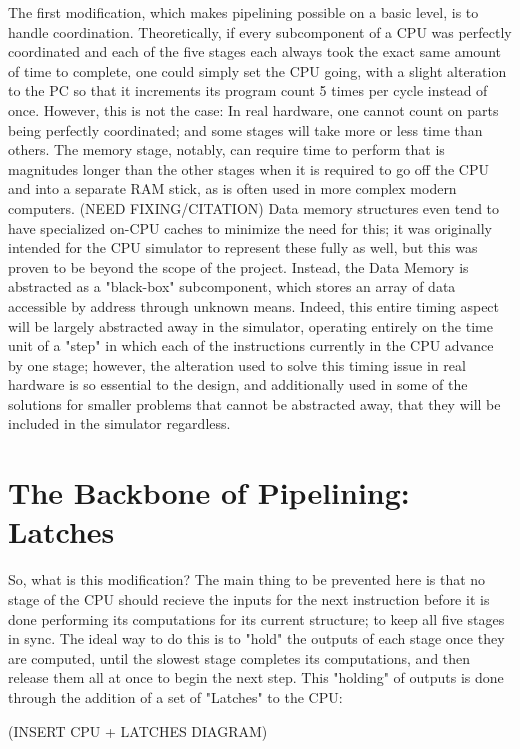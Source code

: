 \documentclass[12pt,twoside]{reedthesis}
\begin{document}
The first modification, which makes pipelining possible on a basic level, is to handle coordination. Theoretically, if  every subcomponent of a CPU was perfectly coordinated and each of the five stages each always took the exact same amount of time to complete, one could simply set the CPU going, with a slight alteration to the PC so that it increments its program count 5 times per cycle instead of once. However, this is not the case: In real hardware, one cannot count on parts being perfectly coordinated; and some stages will take more or less time than others. The memory stage, notably, can require time to perform that is magnitudes longer than the other stages when it is required to go off the CPU and into a separate RAM stick, as is often used in more complex modern computers. (NEED FIXING/CITATION) Data memory structures even tend to have specialized on-CPU caches to minimize the need for this; it was originally intended for the CPU simulator to represent these fully as well, but this was proven to be beyond the scope of the project. Instead, the Data Memory is abstracted as a "black-box" subcomponent, which stores an array of data accessible by address through unknown means. Indeed, this entire timing aspect will be largely abstracted away in the simulator, operating entirely on the time unit of a "step" in which each of the instructions currently in the CPU advance by one stage; however, the alteration used to solve this timing issue in real hardware is so essential to the design, and additionally used in some of the solutions for smaller problems that cannot be abstracted away, that they will be included in the simulator regardless.

\section{The Backbone of Pipelining: Latches}

So, what is this modification? The main thing to be prevented here is that no stage of the CPU should recieve the inputs for the next instruction before it is done performing its computations for its current structure; to keep all five stages in sync. The ideal way to do this is to "hold" the outputs of each stage once they are computed, until the slowest stage completes its computations, and then release them all at once to begin the next step. This "holding" of outputs is done through the addition of a set of "Latches" to the CPU:

(INSERT CPU + LATCHES DIAGRAM)
\end{document}
